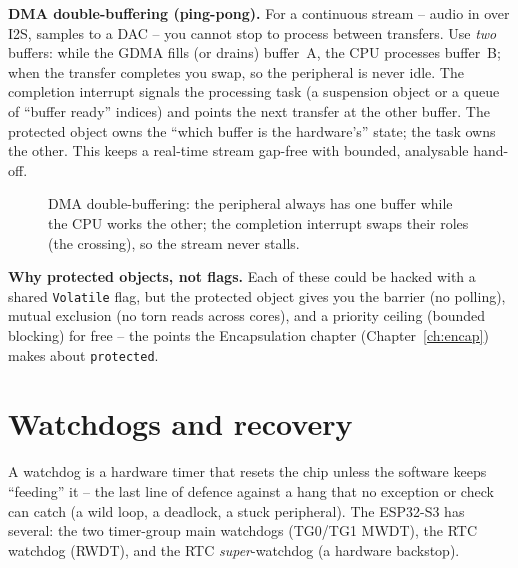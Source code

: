 \textbf{DMA double-buffering (ping-pong).} For a continuous stream -- audio in
over I2S, samples to a DAC -- you cannot stop to process between transfers. Use
\emph{two} buffers: while the GDMA fills (or drains) buffer~A, the CPU processes
buffer~B; when the transfer completes you swap, so the peripheral is never idle.
The completion interrupt signals the processing task (a suspension object or a
queue of ``buffer ready'' indices) and points the next transfer at the other
buffer. The protected object owns the ``which buffer is the hardware's'' state;
the task owns the other. This keeps a real-time stream gap-free with bounded,
analysable hand-off.

\begin{figure}[ht]
\centering
{}
\caption{DMA double-buffering: the peripheral always has one buffer while the CPU
works the other; the completion interrupt swaps their roles (the crossing), so the
stream never stalls.}
\label{fig:pingpong}
\end{figure}

\textbf{Why protected objects, not flags.} Each of these could be hacked with a
shared \texttt{Volatile} flag, but the protected object gives you the barrier (no
polling), mutual exclusion (no torn reads across cores), and a priority ceiling
(bounded blocking) for free -- the points the Encapsulation chapter
(Chapter~\ref{ch:encap}) makes about \texttt{protected}.

\section{Watchdogs and recovery}
\label{sec:watchdogs}

A watchdog is a hardware timer that resets the chip unless the software keeps
``feeding'' it -- the last line of defence against a hang that no exception or
check can catch (a wild loop, a deadlock, a stuck peripheral). The ESP32-S3 has
several: the two timer-group main watchdogs (TG0/TG1 MWDT), the RTC watchdog
(RWDT), and the RTC \emph{super}-watchdog (a hardware backstop).

